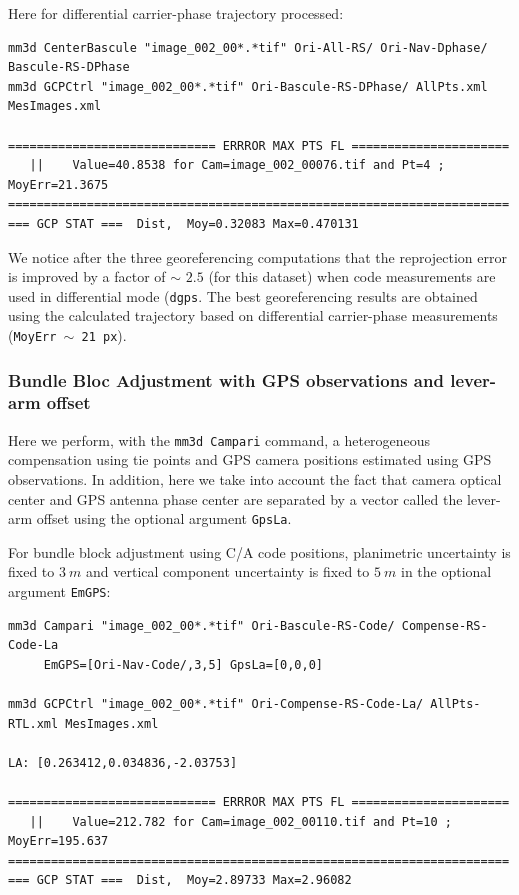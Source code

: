 

Here for differential carrier-phase trajectory processed:

\begin{verbatim}
mm3d CenterBascule "image_002_00*.*tif" Ori-All-RS/ Ori-Nav-Dphase/ Bascule-RS-DPhase
mm3d GCPCtrl "image_002_00*.*tif" Ori-Bascule-RS-DPhase/ AllPts.xml MesImages.xml

============================= ERRROR MAX PTS FL ======================
   ||    Value=40.8538 for Cam=image_002_00076.tif and Pt=4 ; MoyErr=21.3675
======================================================================
=== GCP STAT ===  Dist,  Moy=0.32083 Max=0.470131
\end{verbatim}


We notice after the three georeferencing computations that the reprojection error is improved by a factor of $\sim$ $2.5$ (for this dataset) when code measurements are used in differential mode ({\tt dgps}. The best georeferencing results are obtained using the calculated trajectory based on differential carrier-phase measurements ({\tt MoyErr $\sim$ 21 px}).

\subsubsection{Bundle Bloc Adjustment with GPS observations and lever-arm offset}
Here we perform, with the {\tt mm3d Campari} command, a heterogeneous compensation using tie points and GPS camera positions estimated using GPS observations. In addition, here we take into account the fact that camera optical center and GPS antenna phase center are separated by a vector called the lever-arm offset using the optional argument {\tt GpsLa}.\newline

For bundle block adjustment using C/A code positions, planimetric uncertainty is fixed to $3\ m$ and vertical component uncertainty is fixed to $5\ m$ in the optional argument {\tt EmGPS}:

\begin{verbatim}
mm3d Campari "image_002_00*.*tif" Ori-Bascule-RS-Code/ Compense-RS-Code-La
     EmGPS=[Ori-Nav-Code/,3,5] GpsLa=[0,0,0]
     
mm3d GCPCtrl "image_002_00*.*tif" Ori-Compense-RS-Code-La/ AllPts-RTL.xml MesImages.xml

LA: [0.263412,0.034836,-2.03753]

============================= ERRROR MAX PTS FL ======================
   ||    Value=212.782 for Cam=image_002_00110.tif and Pt=10 ; MoyErr=195.637
======================================================================
=== GCP STAT ===  Dist,  Moy=2.89733 Max=2.96082
\end{verbatim}


